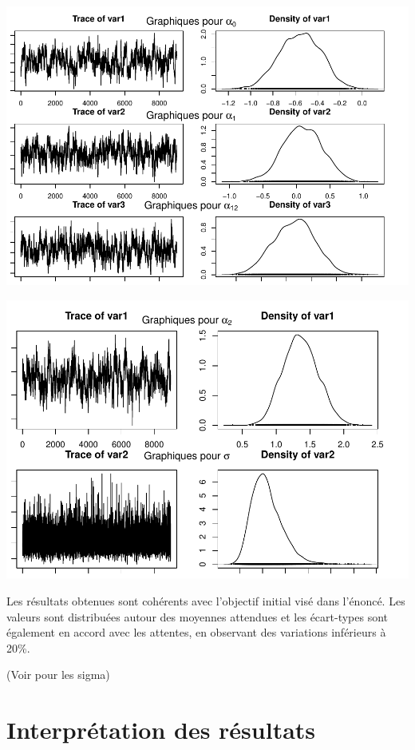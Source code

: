 \documentclass[
]{article}
\begin{document}
\begin{center}\includegraphics{projet1---rapport_files/figure-latex/unnamed-chunk-1-1} \end{center}

\begin{center}\includegraphics{projet1---rapport_files/figure-latex/unnamed-chunk-1-2} \end{center}

Les résultats obtenues sont cohérents avec l'objectif initial visé dans
l'énoncé. Les valeurs sont distribuées autour des moyennes attendues et
les écart-types sont également en accord avec les attentes, en observant
des variations inférieurs à 20\%.

(Voir pour les sigma)

\hypertarget{interpruxe9tation-des-ruxe9sultats}{%
\section{Interprétation des
résultats}\label{interpruxe9tation-des-ruxe9sultats}}
\end{document}

